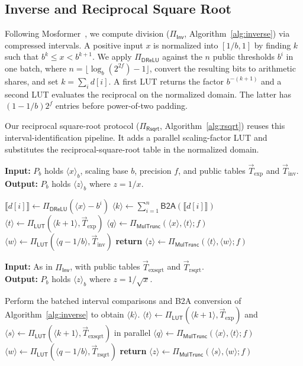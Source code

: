 \documentclass[journal]{IEEEtran}
\theoremstyle{definition}
\theoremstyle{plain}
\newcommand{\ashare}[1]{\langle #1 \rangle}             %
\newcommand{\bshare}[1]{\llbracket #1 \rrbracket}        %
\newcommand{\DReLU}{\mathsf{DReLU}}
\newcommand{\MulTr}{\Pi_{\mathsf{MulTrunc}}}
\begin{document}
\subsection{Inverse and Reciprocal Square Root}
Following Mosformer~\cite{Mosformer}, we compute division
($\Pi_{\mathsf{Inv}}$, Algorithm~\ref{alg:inverse}) via compressed intervals.
A positive input $x$ is normalized into $[1/b,1]$ by finding $k$ such that
$b^k\leq x<b^{k+1}$. We apply $\Pi_{\DReLU}$ against the $n$ public
thresholds $b^i$ in one batch, where
$n=\lfloor\log_b(2^{2f})-1\rfloor$, convert the resulting bits to arithmetic
shares, and set $k=\sum_i d[i]$. A first LUT returns the factor
$b^{-(k+1)}$ and a second LUT evaluates the reciprocal on the normalized
domain. The latter has $(1-1/b)2^f$ entries before power-of-two padding.

Our reciprocal square-root protocol ($\Pi_{\mathsf{Rsqrt}}$,
Algorithm~\ref{alg:rsqrt}) reuses this interval-identification pipeline. It
adds a parallel scaling-factor LUT and substitutes the reciprocal-square-root
table in the normalized domain.

\begin{algorithm}[ht]
  \caption{Inverse ($\Pi_{\text{Inv}}$)}
  \label{alg:inverse}
  \textbf{Input:} $P_b$ holds $\ashare{x}_b$, scaling base $b$, precision $f$, and public tables $\vec{T}_{\text{exp}}$ and $\vec{T}_{\text{inv}}$. \\
  \textbf{Output:} $P_b$ holds $\ashare{z}_b$ where $z=1/x$.
  \begin{algorithmic}[1]
      \State $\bshare{d[i]}\leftarrow\Pi_{\DReLU}(\ashare x-b^i)$
    \EndFor
    \State $\ashare{k}\leftarrow\sum_{i=1}^{n}\mathsf{B2A}(\bshare{d[i]})$
    \State $\ashare t\leftarrow\Pi_{\mathsf{LUT}}(\ashare{k+1},\vec{T}_{\text{exp}})$
    \State $\ashare q\leftarrow\MulTr(\ashare x,\ashare t;f)$
    \State $\ashare w\leftarrow\Pi_{\mathsf{LUT}}(\ashare{q-1/b},\vec{T}_{\text{inv}})$
    \State \textbf{return} $\ashare z\leftarrow\MulTr(\ashare t,\ashare w;f)$
  \end{algorithmic}
\end{algorithm}

\begin{algorithm}[ht]
  \caption{Reciprocal Square Root ($\Pi_{\text{Rsqrt}}$)}
  \label{alg:rsqrt}
  \textbf{Input:} As in $\Pi_{\mathsf{Inv}}$, with public tables $\vec{T}_{\text{exsqrt}}$ and $\vec{T}_{\text{rsqrt}}$. \\
  \textbf{Output:} $P_b$ holds $\ashare z_b$ where $z=1/\sqrt{x}$.
  \begin{algorithmic}[1]
    \State Perform the batched interval comparisons and B2A conversion of Algorithm~\ref{alg:inverse} to obtain $\ashare k$.
    \State $\ashare t\leftarrow\Pi_{\mathsf{LUT}}(\ashare{k+1},\vec{T}_{\text{exp}})$ and $\ashare s\leftarrow\Pi_{\mathsf{LUT}}(\ashare{k+1},\vec{T}_{\text{exsqrt}})$ in parallel
    \State $\ashare q\leftarrow\MulTr(\ashare x,\ashare t;f)$
    \State $\ashare w\leftarrow\Pi_{\mathsf{LUT}}(\ashare{q-1/b},\vec{T}_{\text{rsqrt}})$
    \State \textbf{return} $\ashare z\leftarrow\MulTr(\ashare s,\ashare w;f)$
  \end{algorithmic}
\end{algorithm}
\end{document}
